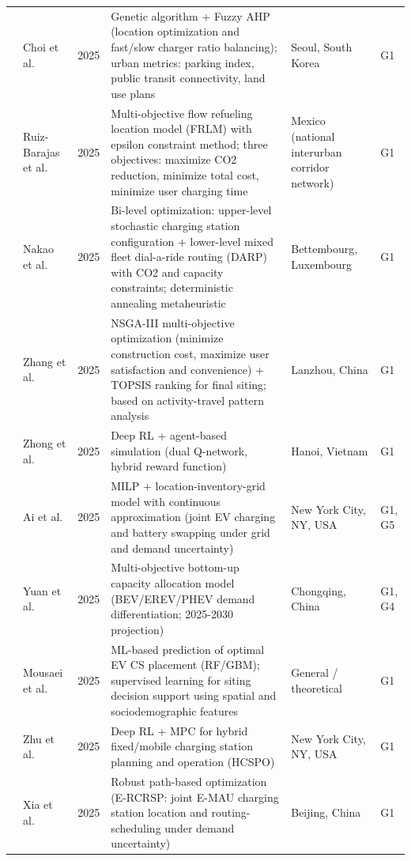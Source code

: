 \documentclass[letterpaper, 12pt, oneside, doublespacing]{Thesis}
\begin{document}
\begin{longtable}{L{0.9cm} L{2.2cm} L{0.8cm} L{3.3cm} L{2.5cm} L{1.5cm}}
\cite{location_and_2025} & Choi et al. & 2025 & Genetic algorithm + Fuzzy AHP (location optimization and fast/slow charger ratio balancing); urban metrics: parking index, public transit connectivity, land use plans & Seoul, South Korea & G1 \\
\cite{multiobjective_model_2025} & Ruiz-Barajas et al. & 2025 & Multi-objective flow refueling location model (FRLM) with epsilon constraint method; three objectives: maximize CO2 reduction, minimize total cost, minimize user charging time & Mexico (national interurban corridor network) & G1 \\
\cite{optimal_mixed_2025} & Nakao et al. & 2025 & Bi-level optimization: upper-level stochastic charging station configuration + lower-level mixed fleet dial-a-ride routing (DARP) with CO2 and capacity constraints; deterministic annealing metaheuristic & Bettembourg, Luxembourg & G1 \\
\cite{optimization_of_2025} & Zhang et al. & 2025 & NSGA-III multi-objective optimization (minimize construction cost, maximize user satisfaction and convenience) + TOPSIS ranking for final siting; based on activity-travel pattern analysis & Lanzhou, China & G1 \\
\cite{optimizing_electric_2025} & Zhong et al. & 2025 & Deep RL + agent-based simulation (dual Q-network, hybrid reward function) & Hanoi, Vietnam & G1 \\
\cite{optimizing_urban_2025} & Ai et al. & 2025 & MILP + location-inventory-grid model with continuous approximation (joint EV charging and battery swapping under grid and demand uncertainty) & New York City, NY, USA & G1, G5 \\
\cite{planning_future_2025} & Yuan et al. & 2025 & Multi-objective bottom-up capacity allocation model (BEV/EREV/PHEV demand differentiation; 2025-2030 projection) & Chongqing, China & G1, G4 \\
\cite{predicting_optimal_2025} & Mousaei et al. & 2025 & ML-based prediction of optimal EV CS placement (RF/GBM); supervised learning for siting decision support using spatial and sociodemographic features & General {\slash} theoretical & G1 \\
\cite{reinforcement_learning_2025} & Zhu et al. & 2025 & Deep RL + MPC for hybrid fixed/mobile charging station planning and operation (HCSPO) & New York City, NY, USA & G1 \\
\cite{robust_charging_2025} & Xia et al. & 2025 & Robust path-based optimization (E-RCRSP: joint E-MAU charging station location and routing-scheduling under demand uncertainty) & Beijing, China & G1 \\

\end{longtable}
\end{document}

